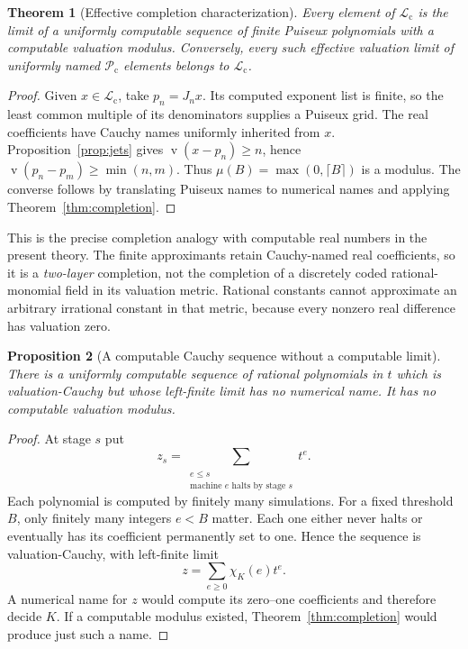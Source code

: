 \documentclass[11pt,letterpaper]{article}
\numberwithin{equation}{section}
\newtheorem{theorem}{Theorem}[section]
\newtheorem{proposition}[theorem]{Proposition}
\theoremstyle{definition}
\theoremstyle{remark}
\newcommand{\Lc}{\mathcal L_{\mathrm c}}
\newcommand{\Pc}{\mathcal P_{\mathrm c}}
\newcommand{\val}{\operatorname{v}}
\begin{document}
\begin{theorem}[Effective completion characterization]
\label{thm:completioncharacter}
Every element of $\Lc$ is the limit of a uniformly computable sequence
of finite Puiseux polynomials with a computable valuation modulus.
Conversely, every such effective valuation limit of uniformly named
$\Pc$ elements belongs to $\Lc$.
\end{theorem}
\begin{proof}
Given $x\in\Lc$, take $p_n=J_nx$. Its computed exponent list is finite,
so the least common multiple of its denominators supplies a Puiseux grid.
The real coefficients have Cauchy names uniformly inherited from $x$.
Proposition~\ref{prop:jets} gives $\val(x-p_n)\ge n$, hence
$\val(p_n-p_m)\ge\min(n,m)$. Thus
$\mu(B)=\max(0,\lceil B\rceil)$ is a modulus. The converse follows by
translating Puiseux names to numerical names and applying
Theorem~\ref{thm:completion}.
\end{proof}

This is the precise completion analogy with computable real numbers in the
present theory. The finite approximants retain Cauchy-named real
coefficients, so it is a \emph{two-layer} completion, not the completion of
a discretely coded rational-monomial field in its valuation metric.
Rational constants cannot approximate an arbitrary irrational constant in
that metric, because every nonzero real difference has valuation zero.

\begin{proposition}[A computable Cauchy sequence without a computable limit]
\label{prop:nonmodulus}
There is a uniformly computable sequence of rational polynomials in $t$
which is valuation-Cauchy but whose left-finite limit has no numerical name.
It has no computable valuation modulus.
\end{proposition}
\begin{proof}
At stage $s$ put
\[
 z_s=\sum_{\substack{e\le s\\\text{machine }e\text{ halts by stage }s}}t^e.
\]
Each polynomial is computed by finitely many simulations. For a fixed
threshold $B$, only finitely many integers $e<B$ matter. Each one either
never halts or eventually has its coefficient permanently set to one.
Hence the sequence is valuation-Cauchy, with left-finite limit
\[
 z=\sum_{e\ge0}\chi_K(e)t^e.
\]
A numerical name for $z$ would compute its zero--one coefficients and
therefore decide $K$. If a computable modulus existed,
Theorem~\ref{thm:completion} would produce just such a name.
\end{proof}
\end{document}
